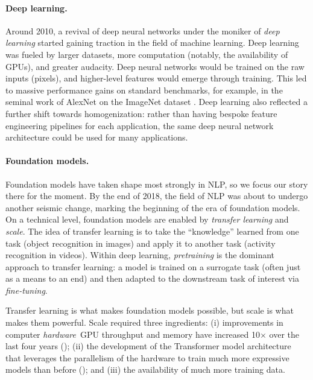 \paragraph{Deep learning.}

Around 2010, a revival of deep neural networks
under the moniker of \emph{deep learning} \citep{lecun2015deep} started gaining traction in the field of machine learning.
Deep learning was fueled by larger datasets,
more computation (notably, the availability of GPUs),
and greater audacity.
Deep neural networks would be trained on the raw inputs (\eg pixels),
and higher-level features would emerge through training.
This led to massive performance gains on standard benchmarks,
for example, in the seminal work of AlexNet \citep{krizhevsky2012imagenet} on the ImageNet dataset \citep{deng2009imagenet}.
Deep learning also reflected a further shift towards homogenization:
rather than having bespoke feature engineering pipelines for each application,
the same deep neural network architecture could be
used for many applications.

\paragraph{Foundation models.}

Foundation models have taken shape most strongly in NLP, so we focus our story there for the moment.
By the end of 2018, the field of NLP was about to undergo another seismic change,
marking the beginning of the era of foundation models.
On a technical level, foundation models are enabled by
\emph{transfer learning} \citep{thrun1998lifelong} and \emph{scale}.
The idea of transfer learning is to take the ``knowledge'' learned from one task (\eg object recognition in images)
and apply it to another task (\eg activity recognition in videos).
Within deep learning, \emph{pretraining} is the dominant approach to transfer learning:
a model is trained on a surrogate task (often just as a means to an end) and then adapted to
the downstream task of interest via \emph{fine-tuning}.

Transfer learning is what makes foundation models possible,
but scale is what makes them powerful.
Scale required three ingredients:
(i) improvements in computer \emph{hardware}\dash{}\eg~GPU throughput and memory have increased 10$\times$ over the last four years ();
(ii) the development of the Transformer model architecture \citep{vaswani2017attention}
that leverages the parallelism of the hardware to train much more expressive models than before ();
and (iii) the availability of much more training data.

